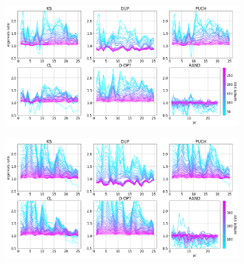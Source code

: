 \documentclass[journal=ancham,manuscript=article]{achemso}
\begin{document}
\begin{figure}[t]
    \centering
    \caption{}
    \label{fig_specific_framework_detereigevect}
\end{figure}

\begin{figure}[b]
\includegraphics[width=0.8\textwidth]{manuscript/figures/d01_milk_specific_framework_eigenvalsratio.png}
\centering
\caption{}
\label{fig_d01_milk_specific_framework_eigenvalsratio}
\end{figure}

\begin{figure}[b]
\includegraphics[width=0.8\textwidth]{manuscript/figures/d02_manure_specific_framework_eigenvalsratio.png}
\centering
\caption{}
\label{fig_d02_manure_specific_framework_eigenvalsratio}
\end{figure}
\end{document}
